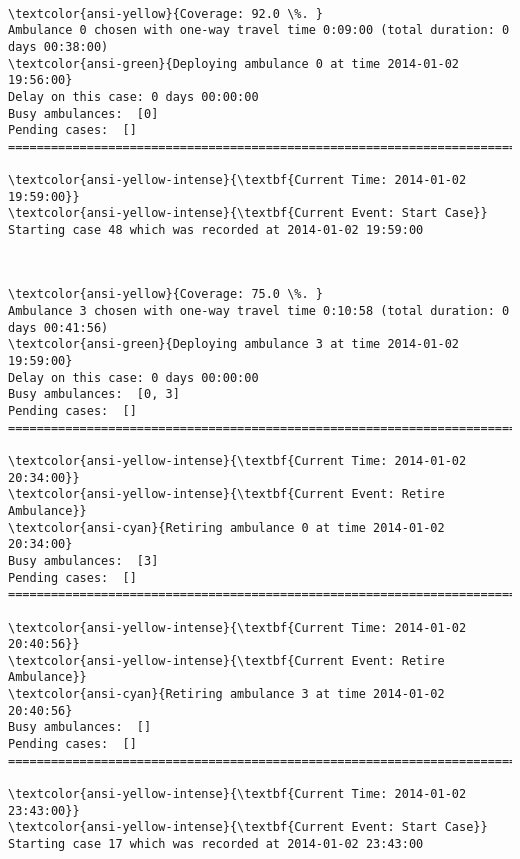 \documentclass[11pt]{article}
\begin{document}
    \begin{center}
    \end{center}
    { \hspace*{\fill} \\}
    
    \begin{Verbatim}[commandchars=\\\{\}]
\textcolor{ansi-yellow}{Coverage: 92.0 \%. }
Ambulance 0 chosen with one-way travel time 0:09:00 (total duration: 0 days 00:38:00)
\textcolor{ansi-green}{Deploying ambulance 0 at time 2014-01-02 19:56:00}
Delay on this case: 0 days 00:00:00
Busy ambulances:  [0]
Pending cases:  []
========================================================================

\textcolor{ansi-yellow-intense}{\textbf{Current Time: 2014-01-02 19:59:00}}
\textcolor{ansi-yellow-intense}{\textbf{Current Event: Start Case}}
Starting case 48 which was recorded at 2014-01-02 19:59:00

    \end{Verbatim}

    \begin{center}
    \end{center}
    { \hspace*{\fill} \\}
    
    \begin{Verbatim}[commandchars=\\\{\}]
\textcolor{ansi-yellow}{Coverage: 75.0 \%. }
Ambulance 3 chosen with one-way travel time 0:10:58 (total duration: 0 days 00:41:56)
\textcolor{ansi-green}{Deploying ambulance 3 at time 2014-01-02 19:59:00}
Delay on this case: 0 days 00:00:00
Busy ambulances:  [0, 3]
Pending cases:  []
========================================================================

\textcolor{ansi-yellow-intense}{\textbf{Current Time: 2014-01-02 20:34:00}}
\textcolor{ansi-yellow-intense}{\textbf{Current Event: Retire Ambulance}}
\textcolor{ansi-cyan}{Retiring ambulance 0 at time 2014-01-02 20:34:00}
Busy ambulances:  [3]
Pending cases:  []
========================================================================

\textcolor{ansi-yellow-intense}{\textbf{Current Time: 2014-01-02 20:40:56}}
\textcolor{ansi-yellow-intense}{\textbf{Current Event: Retire Ambulance}}
\textcolor{ansi-cyan}{Retiring ambulance 3 at time 2014-01-02 20:40:56}
Busy ambulances:  []
Pending cases:  []
========================================================================

\textcolor{ansi-yellow-intense}{\textbf{Current Time: 2014-01-02 23:43:00}}
\textcolor{ansi-yellow-intense}{\textbf{Current Event: Start Case}}
Starting case 17 which was recorded at 2014-01-02 23:43:00

    \end{Verbatim}
\end{document}
